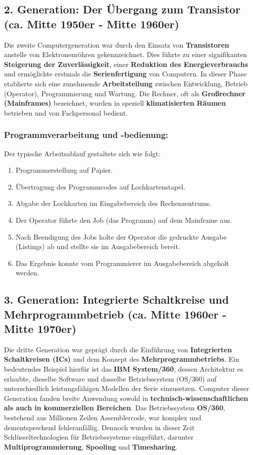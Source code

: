 \subsection{2. Generation: Der Übergang zum Transistor (ca. Mitte 1950er - Mitte 1960er)}

Die zweite Computergeneration war durch den Einsatz von \textbf{Transistoren} anstelle von Elektronenröhren gekennzeichnet. Dies führte zu einer signifikanten \textbf{Steigerung der Zuverlässigkeit}, einer \textbf{Reduktion des Energieverbrauchs} und ermöglichte erstmals die \textbf{Serienfertigung} von Computern. In dieser Phase etablierte sich eine zunehmende \textbf{Arbeitsteilung} zwischen Entwicklung, Betrieb (Operator), Programmierung und Wartung. Die Rechner, oft als \textbf{Großrechner (Mainframes)} bezeichnet, wurden in speziell \textbf{klimatisierten Räumen} betrieben und von Fachpersonal bedient.

\subsubsection*{Programmverarbeitung und -bedienung:}
Der typische Arbeitsablauf gestaltete sich wie folgt:
\begin{enumerate}
    \item Programmerstellung auf Papier.
    \item Übertragung des Programmcodes auf Lochkartenstapel.
    \item Abgabe der Lochkarten im Eingabebereich des Rechenzentrums.
    \item Der Operator führte den Job (das Programm) auf dem Mainframe aus.
    \item Nach Beendigung des Jobs holte der Operator die gedruckte Ausgabe (Listings) ab und stellte sie im Ausgabebereich bereit.
    \item Das Ergebnis konnte vom Programmierer im Ausgabebereich abgeholt werden.
\end{enumerate}

\subsection{3. Generation: Integrierte Schaltkreise und Mehrprogrammbetrieb (ca. Mitte 1960er - Mitte 1970er)}

Die dritte Generation war geprägt durch die Einführung von \textbf{Integrierten Schaltkreisen (ICs)} und dem Konzept des \textbf{Mehrprogrammbetriebs}. Ein bedeutendes Beispiel hierfür ist das \textbf{IBM System/360}, dessen Architektur es erlaubte, dieselbe Software und dasselbe Betriebssystem (OS/360) auf unterschiedlich leistungsfähigen Modellen der Serie einzusetzen. Computer dieser Generation fanden breite Anwendung sowohl in \textbf{technisch-wissenschaftlichen als auch in kommerziellen Bereichen}. Das Betriebssystem \textbf{OS/360}, bestehend aus Millionen Zeilen Assemblercode, war komplex und dementsprechend fehleranfällig. Dennoch wurden in dieser Zeit Schlüsseltechnologien für Betriebssysteme eingeführt, darunter \textbf{Multiprogrammierung}, \textbf{Spooling} und \textbf{Timesharing}.

